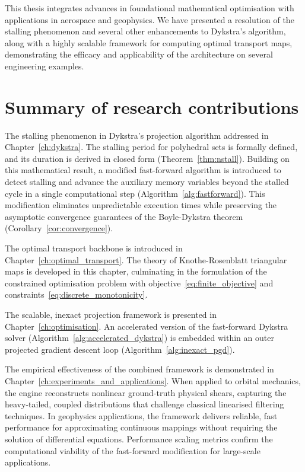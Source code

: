 This thesis integrates advances in foundational mathematical optimisation with applications in aerospace and geophysics. We have presented a resolution of the stalling phenomenon and several other enhancements to Dykstra's algorithm, along with a highly scalable framework for computing optimal transport maps, demonstrating the efficacy and applicability of the architecture on several engineering examples.

\section{Summary of research contributions} \label{sec:summary_of_contributions}

The stalling phenomenon in Dykstra's projection algorithm addressed in Chapter~\ref{ch:dykstra}. The stalling period for polyhedral sets is formally defined, and its duration is derived in closed form (Theorem~\ref{thm:nstall}). Building on this mathematical result, a modified fast-forward algorithm is introduced to detect stalling and advance the auxiliary memory variables beyond the stalled cycle in a single computational step (Algorithm~\ref{alg:fastforward}). This modification eliminates unpredictable execution times while preserving the asymptotic convergence guarantees of the Boyle-Dykstra theorem (Corollary~\ref{cor:convergence}).

The optimal transport backbone is introduced in Chapter~\ref{ch:optimal_transport}. The theory of Knothe-Rosenblatt triangular maps is developed in this chapter, culminating in the formulation of the constrained optimisation problem with objective~\eqref{eq:finite_objective} and constraints~\eqref{eq:discrete_monotonicity}.

The scalable, inexact projection framework is presented in Chapter~\ref{ch:optimisation}. An accelerated version of the fast-forward Dykstra solver (Algorithm~\ref{alg:accelerated_dykstra}) is embedded within an outer projected gradient descent loop (Algorithm~\ref{alg:inexact_pgd}).

The empirical effectiveness of the combined framework is demonstrated in Chapter~\ref{ch:experiments_and_applications}. When applied to orbital mechanics, the engine reconstructs nonlinear ground-truth physical shears, capturing the heavy-tailed, coupled distributions that challenge classical linearised filtering techniques. In geophysics applications, the framework delivers reliable, fast performance for approximating continuous mappings without requiring the solution of differential equations. Performance scaling metrics confirm the computational viability of the fast-forward modification for large-scale applications.

